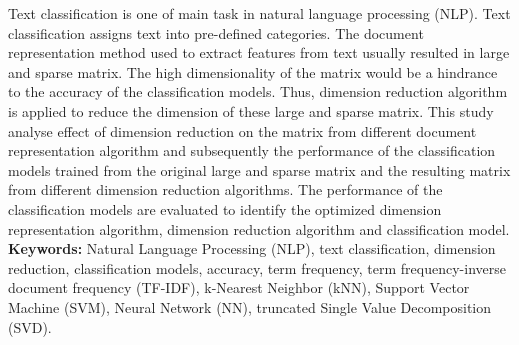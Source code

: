 Text classification is one of main task in natural language processing (NLP). Text classification assigns text into pre-defined categories. The document representation method used to extract features from text usually resulted in large and sparse matrix. The high dimensionality of the matrix would be a hindrance to the accuracy of the classification models. Thus, dimension reduction algorithm is applied to reduce the dimension of these large and sparse matrix. This study analyse effect of dimension reduction on the matrix from different document representation algorithm and subsequently the performance of the classification models trained from the original large and sparse matrix and the resulting matrix from different dimension reduction algorithms. The performance of the classification models are evaluated to identify the optimized dimension representation algorithm, dimension reduction algorithm and classification model.\\

\textbf{Keywords: } Natural Language Processing (NLP), text classification, dimension reduction, classification models, accuracy, term frequency, term frequency-inverse document frequency (TF-IDF), k-Nearest Neighbor (kNN), Support Vector Machine (SVM), Neural Network (NN), truncated Single Value Decomposition (SVD).
